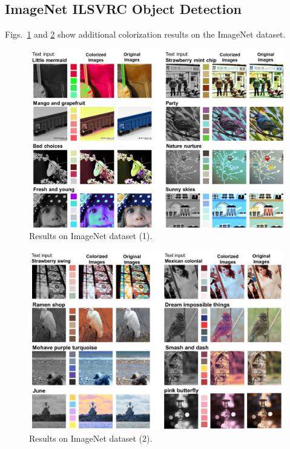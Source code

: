 \documentclass[runningheads]{llncs}
\begin{document}
\subsection{ImageNet ILSVRC Object Detection}
Figs.~\ref{fig:imagenet1} and \ref{fig:imagenet2} show additional colorization results on the ImageNet dataset.
\begin{figure}[h!]
\centering 
\includegraphics[width=0.99\textwidth]{./imagenet_supp1.png}
\vspace*{-2mm}\caption{Results on ImageNet dataset (1).}\label{fig:imagenet1}
\end{figure}

\begin{figure}[h!]
\centering 
\includegraphics[width=0.99\textwidth]{./imagenet_supp2.png}
\vspace*{-2mm}\caption{Results on ImageNet dataset (2).}\label{fig:imagenet2}
\end{figure}
\end{document}
